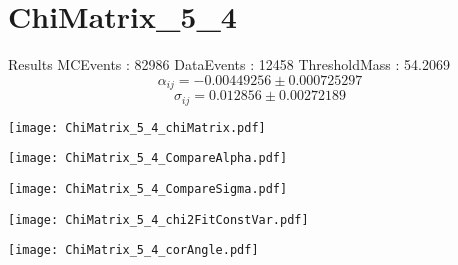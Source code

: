 \documentclass[a4paper,12pt]{article}
\begin{document}
\section{ChiMatrix\_5\_4}
\begin{minipage}{0.49\linewidth} Results \newline
MCEvents : 82986\newline
DataEvents : 12458 \newline
ThresholdMass : 54.2069\\
$$\alpha_{ij} = -0.00449256\pm 0.000725297$$
$$\sigma_{ij} = 0.012856\pm 0.00272189$$
\end{minipage}\hfill
\begin{minipage}{0.49\linewidth} 
\texttt{[image: ChiMatrix\_5\_4\_chiMatrix.pdf]}\\
\end{minipage}
\hfill
\begin{minipage}{0.49\linewidth} 
\texttt{[image: ChiMatrix\_5\_4\_CompareAlpha.pdf]}\\
\end{minipage}
\hfill
\begin{minipage}{0.49\linewidth} 
\texttt{[image: ChiMatrix\_5\_4\_CompareSigma.pdf]}\\
\end{minipage}
\begin{minipage}{0.49\linewidth} 
\texttt{[image: ChiMatrix\_5\_4\_chi2FitConstVar.pdf]}\\
\end{minipage}
\hfill
\begin{minipage}{0.49\linewidth} 
\texttt{[image: ChiMatrix\_5\_4\_corAngle.pdf]}\\
\end{minipage}
\end{document}
